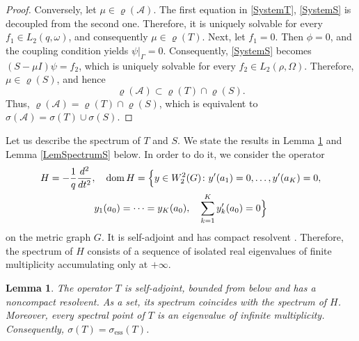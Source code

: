 \documentclass[reqno]{amsart}
\newtheorem{lem}{Lemma}
\theoremstyle{definition}
\theoremstyle{remark}
\numberwithin{equation}{section}
\newcommand{\dmn}{\mathop{\rm dom}}
\newcommand{\cA}{\mathcal{A}}
\begin{document}
\begin{proof}
Conversely, let $\mu\in\varrho(\cA)$. The first equation in \eqref{SystemT}, \eqref{SystemS} is decoupled from the second one. Therefore, it is uniquely solvable for every $f_1\in L_2(q,\omega)$, and consequently $\mu\in\varrho(T)$. Next, let $f_1=0$. Then $\phi=0$, and the coupling condition yields $\psi|_\Gamma=0$. Consequently,  \eqref{SystemS} becomes $(S-\mu I)\psi=f_2$, which is uniquely solvable for every $f_2\in L_2(\rho,\Omega)$.  Therefore, $\mu\in\varrho(S)$, and hence
\begin{equation*} 
    \varrho(\cA)\subset\varrho(T)\cap\varrho(S). 
\end{equation*} 
Thus,  $\varrho(\cA)=\varrho(T)\cap\varrho(S)$, which is equivalent to $\sigma(\cA)=\sigma(T)\cup\sigma(S)$.
\end{proof}



Let us describe the spectrum of $T$ and $S$. We state the results in Lemma \ref{LemSpectrumT} and Lemma \ref{LemSpectrumS} below. In order to do it, we consider the operator
\begin{multline*}
 H=-\frac 1q\frac{d^2}{dt^2},\quad \dmn H = \Big\{y\in W_2^2(G)\colon   y'(a_1)=0,\dots, y'(a_K)=0,\\y_1(a_0)=\dots= y_K(a_0), \quad \sum_{k=1}^Ky'_k(a_0)=0\Big\}
\end{multline*}
on the metric graph $G$. It is self-adjoint and has compact resolvent \cite[Th. 3.1.1]{BerkolaikoKuchmentBook}. Therefore, the spectrum of $H$ consists of a sequence of isolated real eigenvalues of finite multiplicity accumulating only at $+\infty$.



\begin{lem}\label{LemSpectrumT}
The operator $T$ is self-adjoint, bounded from below and has a noncompact resolvent. As a set,  its spectrum coincides with the spectrum of $H$. Moreover, every spectral point of $T$ is an eigenvalue of infinite multiplicity. Consequently, $\sigma(T)=\sigma_{\mathrm{ess}}(T)$.
\end{lem}
\end{document}
